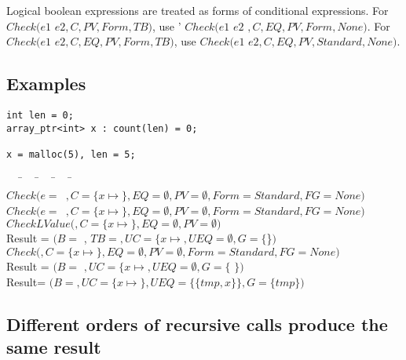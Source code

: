 Logical boolean expressions are treated as forms of conditional expressions.
For  $Check(e1$ \code{&&} $ e2, C, PV, Form, TB)$, use '
$Check(e1$  $e2$ $, C, EQ, PV, Form, None)$.  
For $Check(e1$ \code{ \|\| } $ e2, C, EQ, PV, Form, TB)$,  use 
$Check(e1 $  $e2, C, EQ, PV, Standard, None)$.

\subsection{Examples}

\begin{lstlisting}
int len = 0;
array_ptr<int> x : count(len) = 0;

x = malloc(5), len = 5;
\end{lstlisting}

\begin{small}
\begin{tabbing}
~~~\=~~~\=~~~\=~~~\=~~~\=\\
$Check(e=$~$, C=\{x \mapsto$$\},
       EQ=\emptyset, PV=\emptyset, Form=Standard, FG=None)$ \\
  \>$Check(e=$~$,C=\{x\mapsto$$\},
           EQ=\emptyset, PV=\emptyset, Form=Standard, FG=None)$ \\
  \>\>$CheckLValue($$, C = \{x\mapsto$$\}, EQ = \emptyset, PV = \emptyset)$ \\
  \>\>\>Result = $(B = $ , $TB = $$,
                 UC = \{x \mapsto$$, UEQ = \emptyset, G = \{$\}$)$ \\
  \>\>$Check($$,C  =\{x\mapsto$$\}, EQ = \emptyset, PV = \emptyset, Form = Standard, FG = None)$\\
  \>\>\>Result = $(B = $ $, UC = \{x\mapsto$$ , UEQ = \emptyset, G = \{$ $\})$\\  
  \>\>Result= $(B = $$, UC = \{x\mapsto $$\}, UEQ= \{\{ tmp, x\}\}, G = \{tmp\})$ \\
\end{tabbing}
\end{small}

\subsection{Different orders of recursive calls produce the same result}

